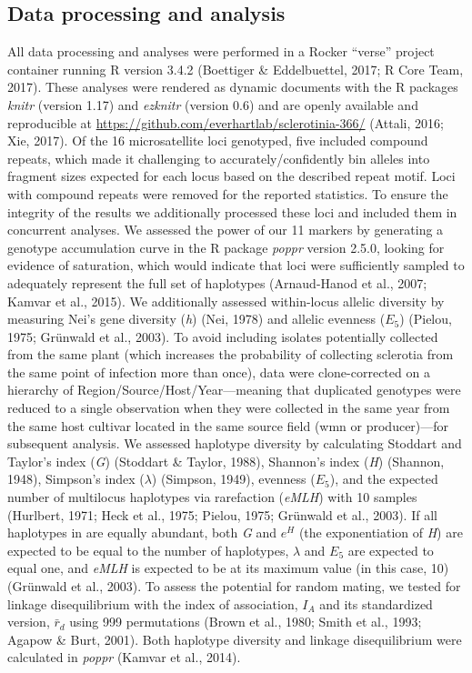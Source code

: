 \documentclass[fleqn,10pt,lineno]{wlpeerj} %
\theoremstyle{definition}
\theoremstyle{definition}
\theoremstyle{definition}
\theoremstyle{remark}
\begin{document}
\subsection*{Data processing and
analysis}\label{data-processing-and-analysis}

All data processing and analyses were performed in a Rocker ``verse''
project container running R version 3.4.2 (Boettiger \& Eddelbuettel,
2017; R Core Team, 2017). These analyses were rendered as dynamic
documents with the R packages \emph{knitr} (version 1.17) and
\emph{ezknitr} (version 0.6) and are openly available and reproducible
at \url{https://github.com/everhartlab/sclerotinia-366/} (Attali, 2016;
Xie, 2017). Of the 16 microsatellite loci genotyped, five included
compound repeats, which made it challenging to accurately/confidently
bin alleles into fragment sizes expected for each locus based on the
described repeat motif. Loci with compound repeats were removed for the
reported statistics. To ensure the integrity of the results we
additionally processed these loci and included them in concurrent
analyses. We assessed the power of our 11 markers by generating a
genotype accumulation curve in the R package \emph{poppr} version 2.5.0,
looking for evidence of saturation, which would indicate that loci were
sufficiently sampled to adequately represent the full set of haplotypes
(Arnaud-Hanod et al., 2007; Kamvar et al., 2015). We additionally
assessed within-locus allelic diversity by measuring Nei's gene
diversity (\emph{h}) (Nei, 1978) and allelic evenness (\(E_5\)) (Pielou,
1975; Grünwald et al., 2003). To avoid including isolates potentially
collected from the same plant (which increases the probability of
collecting sclerotia from the same point of infection more than once),
data were clone-corrected on a hierarchy of
Region/Source/Host/Year---meaning that duplicated genotypes were reduced
to a single observation when they were collected in the same year from
the same host cultivar located in the same source field (wmn or
producer)---for subsequent analysis. We assessed haplotype diversity by
calculating Stoddart and Taylor's index (\emph{G}) (Stoddart \& Taylor,
1988), Shannon's index (\emph{H}) (Shannon, 1948), Simpson's index
(\(\lambda\)) (Simpson, 1949), evenness (\(E_5\)), and the expected
number of multilocus haplotypes via rarefaction (\emph{eMLH}) with 10
samples (Hurlbert, 1971; Heck et al., 1975; Pielou, 1975; Grünwald et
al., 2003). If all haplotypes in are equally abundant, both \emph{G} and
\(e^H\) (the exponentiation of \emph{H}) are expected to be equal to the
number of haplotypes, \(\lambda\) and \(E_5\) are expected to equal one,
and \emph{eMLH} is expected to be at its maximum value (in this case,
10) (Grünwald et al., 2003). To assess the potential for random mating,
we tested for linkage disequilibrium with the index of association,
\(I_A\) and its standardized version, \(\bar{r}_d\) using 999
permutations (Brown et al., 1980; Smith et al., 1993; Agapow \& Burt,
2001). Both haplotype diversity and linkage disequilibrium were
calculated in \emph{poppr} (Kamvar et al., 2014).
\end{document}
